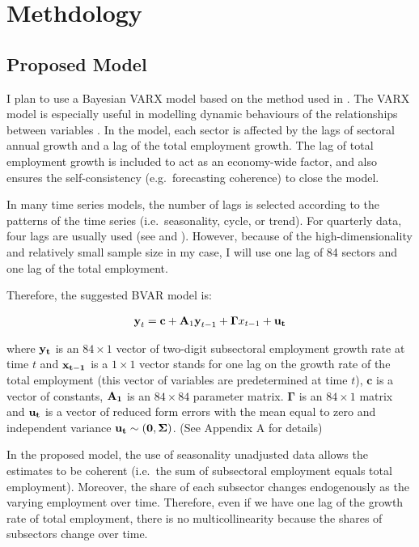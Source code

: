 \documentclass{monashthesis}
\begin{document}
\clearpage

\hypertarget{methdology}{%
\chapter{Methdology}\label{methdology}}

\hypertarget{proposed-model}{%
\section{Proposed Model}\label{proposed-model}}

I plan to use a Bayesian VARX model based on the method used in \textcite{anderson2020}. The VARX model is especially useful in modelling dynamic behaviours of the relationships between variables \autocite{warsono2019}. In the model, each sector is affected by the lags of sectoral annual growth and a lag of the total employment growth. The lag of total employment growth is included to act as an economy-wide factor, and also ensures the self-consistency (e.g.~forecasting coherence) to close the model.

In many time series models, the number of lags is selected according to the patterns of the time series (i.e.~seasonality, cycle, or trend). For quarterly data, four lags are usually used (see \textcite{anderson2020} and \textcite{stock2001}). However, because of the high-dimensionality and relatively small sample size in my case, I will use one lag of 84 sectors and one lag of the total employment.

Therefore, the suggested BVAR model is:

\[
\begin{aligned}
\textbf{y}_t=\textbf{c}+\textbf{A}_1 \textbf{y}_{t-1}+\boldsymbol{\Gamma}{x}_{t-1}+\bf{u}_t
\end{aligned}
\]

where \(\bf{y}_t\) is an \(84\times1\) vector of two-digit subsectoral employment growth rate at time \(t\) and \(\bf{x}_{t-1}\) is a \(1\times1\) vector stands for one lag on the growth rate of the total employment (this vector of variables are predetermined at time \(t\)), \(\textbf{c}\) is a vector of constants, \(\bf{A}_{1}\) is an \(84\times84\) parameter matrix. \(\boldsymbol{\Gamma}\) is an \(84\times1\) matrix and \(\bf{u}_t\) is a vector of reduced form errors with the mean equal to zero and independent variance \(\bf{u}_t \sim (0,\boldsymbol{\Sigma})\). (See Appendix A for details)

In the proposed model, the use of seasonality unadjusted data allows the estimates to be coherent (i.e.~the sum of subsectoral employment equals total employment). Moreover, the share of each subsector changes endogenously as the varying employment over time. Therefore, even if we have one lag of the growth rate of total employment, there is no multicollinearity because the shares of subsectors change over time.
\end{document}
